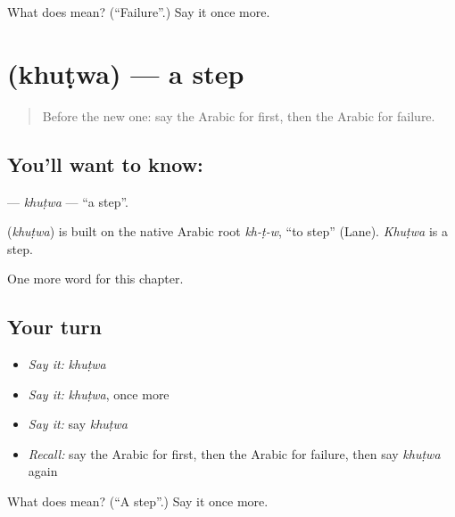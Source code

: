 \begin{tcolorbox}[breakable,colback=teal!4,colframe=teal!35!black,title={Before you move on}]
What does  mean? (\textquotedblleft{}Failure\textquotedblright{}.) Say it once more.
\end{tcolorbox}
\section[\texorpdfstring{\ar{خطوة} (khuṭwa)}{خطوة (khuṭwa)}]{ (khuṭwa) — a step}

\label{lesson:AR-C269-khutwa}



\begin{quote}
Before the new one: say the Arabic for first, then the Arabic for failure.
\end{quote}

\subsection*{You'll want to know: }
\textbf{} — \emph{khuṭwa} — \textquotedblleft{}a step\textquotedblright{}.

\begin{cousinweb}
\textbf{} (\emph{khuṭwa}) is built on the native Arabic root \emph{kh-ṭ-w}, \textquotedblleft{}to step\textquotedblright{} (Lane). \emph{Khuṭwa} is a step.
\end{cousinweb}

\begin{grammarlens}[title={What you've built}]
One more word for this chapter.
\end{grammarlens}

\subsection*{Your turn}
\begin{itemize}
\raggedright
  \item \emph{Say it:} \emph{khuṭwa}
  \item \emph{Say it:} \emph{khuṭwa}, once more
  \item \emph{Say it:} say \emph{khuṭwa}
  \item \emph{Recall:} say the Arabic for first, then the Arabic for failure, then say \emph{khuṭwa} again
\end{itemize}

\begin{tcolorbox}[breakable,colback=teal!4,colframe=teal!35!black,title={Before you move on}]
What does  mean? (\textquotedblleft{}A step\textquotedblright{}.) Say it once more.
\end{tcolorbox}
